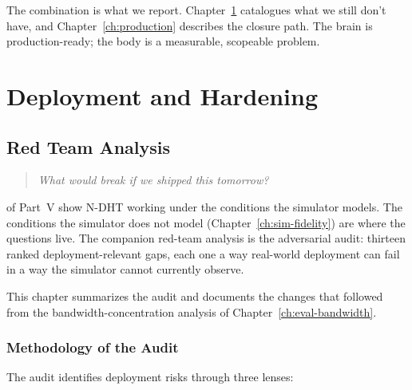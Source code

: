\documentclass[twoside,nobib]{tufte-book}
\newcommand{\NDHT}{N-DHT\xspace}
\begin{document}
The combination is what we report. Chapter~\ref{ch:redteam}
catalogues what we still don't have, and Chapter~\ref{ch:production}
describes the closure path. The brain is production-ready;
the body is a measurable, scopeable problem.


\part{Deployment and Hardening}


\chapter{Red Team Analysis}
\label{ch:redteam}

\begin{quote}
  \itshape What would break if we shipped this tomorrow?
\end{quote}

 of Part~V show \NDHT working
under the conditions the simulator models. The conditions the
simulator does not model
(Chapter~\ref{ch:sim-fidelity}) are where the questions live.
The companion red-team analysis is the
adversarial audit: thirteen ranked deployment-relevant gaps,
each one a way real-world deployment can fail in a way the
simulator cannot currently observe.

This chapter summarizes the audit and documents the changes
that followed from the bandwidth-concentration analysis of
Chapter~\ref{ch:eval-bandwidth}.

\section{Methodology of the Audit}

The audit identifies deployment risks through three lenses:
\end{document}

